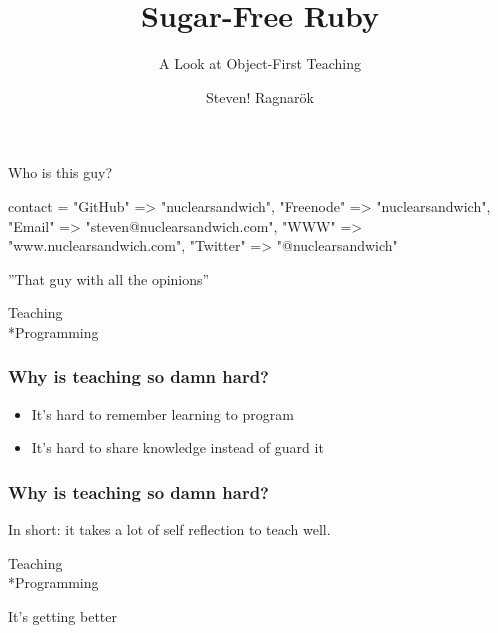 \documentclass[20pt]{beamer}
\author{Steven! Ragnarök}
\title{Sugar-Free Ruby}
\subtitle{A Look at Object-First Teaching}
\begin{document}
\begin{frame}
\titlepage
\end{frame}

\begin{frame}[fragile]
\begin{center}
{Who is this guy?}
\vspace{1cm}\par
\insertauthor
\end{center}
\begin{ruby10pt}
contact = {
  "GitHub"   =>        "nuclearsandwich",
  "Freenode" =>        "nuclearsandwich",
  "Email"    => "steven@nuclearsandwich.com",
  "WWW"      =>    "www.nuclearsandwich.com",
  "Twitter"  =>       "@nuclearsandwich"
}
\end{ruby10pt}
\par\begin{center}
''That guy with all the opinions''
\end{center}
\end{frame}

{
\begin{frame}
\par { Teaching\\*Programming}\par
\vspace{3cm}\hfill
\end{frame}
}

\begin{frame}
\frametitle{Why is teaching so damn hard?}
\begin{itemize}
\pause\item It's hard to remember learning to program
\pause\item It's hard to share knowledge instead of guard it
\end{itemize}
\end{frame}

\begin{frame}
\frametitle{Why is teaching so damn hard?}

In short: it takes a lot of self reflection to teach well.
\end{frame}

{
\begin{frame}
\par { Teaching\\*Programming}\par
\vspace{3cm}\hfill
{It's getting better}
\end{frame}
}
\end{document}
